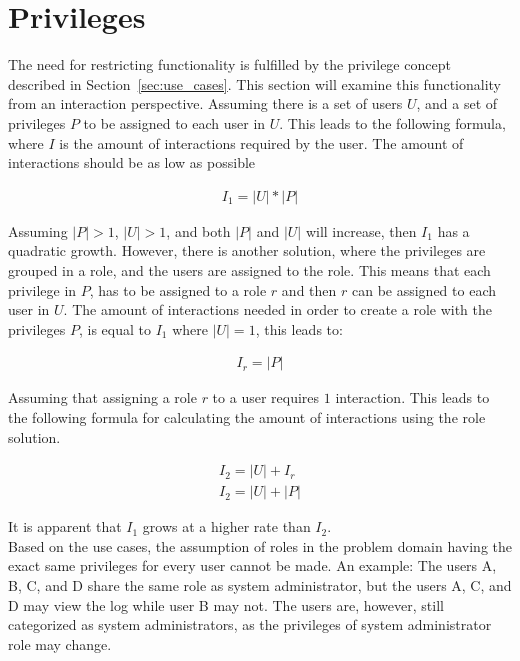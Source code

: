 \section{Privileges}
\label{sec:privileges}
The need for restricting functionality is fulfilled by the privilege concept described in Section~\ref{sec:use_cases}.
This section will examine this functionality from an interaction perspective.
Assuming there is a set of users $U$, and a set of privileges $P$ to be assigned to each user in $U$.
This leads to the following formula, where $I$ is the amount of interactions required by the user.
The amount of interactions should be as low as possible

\begin{align}
I_1 = |U|*|P|
\end{align}

Assuming $|P| > 1$, $|U| > 1$, and both $|P|$ and $|U|$ will increase, then $I_1$ has a quadratic growth.
However, there is another solution, where the privileges are grouped in a role, and the users are assigned to the role.
This means that each privilege in $P$, has to be assigned to a role $r$ and then $r$ can be assigned to each user in $U$.
The amount of interactions needed in order to create a role with the privileges $P$, is equal to $I_1$ where $|U| = 1$, this leads to:

\begin{align}
I_r = |P|
\end{align}

Assuming that assigning a role $r$ to a user requires $1$ interaction.
This leads to the following formula for calculating the amount of interactions using the role solution.

\begin{align}
I_2 = |U|+I_r \\
I_2 = |U|+|P|
\end{align}

It is apparent that $I_1$ grows at a higher rate than $I_2$. \\

Based on the use cases, the assumption of roles in the problem domain having the exact same privileges for every user cannot be made.
An example: The users A, B, C, and D share the same role as system administrator, but the users A, C, and D may view the log while user B may not.
The users are, however, still categorized as system administrators, as the privileges of system administrator role may change. \\

